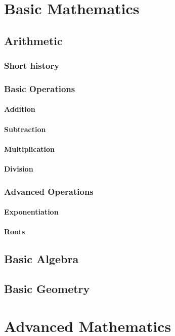\documentclass[a4paper]{book}
\begin{document}
\chapter{Basic Mathematics}
\section{Arithmetic}
\subsection{Short history}
\subsection{Basic Operations}
\subsubsection{Addition}
\subsubsection{Subtraction}
\subsubsection{Multiplication}
\subsubsection{Division}
\subsection{Advanced Operations}
\subsubsection{Exponentiation}
\subsubsection{Roots}

\section{Basic Algebra}

\section{Basic Geometry}

\chapter{Advanced Mathematics}
\end{document}
